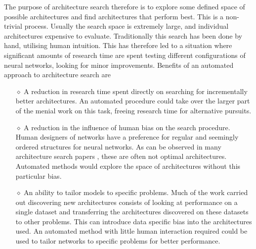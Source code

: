 The purpose of architecture search therefore is to explore some defined space of possible architectures and find architectures that perform best. This is a non-trivial process. Usually the search space is extremely large, and individual architectures expensive to evaluate. Traditionally this search has been done by hand, utilising human intuition. This has therefore led to a situation where significant amounts of research time are  spent testing different configurations of neural networks, looking for minor improvements. Benefits of an automated approach to architecture search are
\begin{itemize}
	\item[\( \diamond \)] A reduction in research time spent directly on searching for incrementally better architectures. An automated procedure could take over the larger part of the menial work on this task, freeing research time for alternative pursuits.
	\item[\( \diamond \)] A reduction in the influence of human bias on the search procedure. Human designers of networks have a preference for regular and seemingly ordered structures for neural networks. As can be observed in many architecture search papers \cite{Baker2016,Brock2017,zoph2016neural,zoph2018learning}, these are often not optimal architectures. Automated methods would explore the space of architectures without this particular bias.
	\item[\( \diamond \)] An ability to tailor models to specific problems. Much of the work carried out discovering new architectures consists of looking at performance on a single dataset and transferring the architectures discovered on these datasets to other problems. This can introduce data specific bias into the architectures used. An automated method with little human interaction required could be used to tailor networks to specific problems for better performance. 
\end{itemize}

